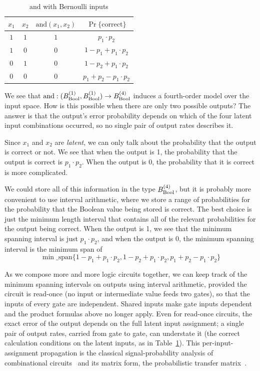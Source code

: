 \documentclass[../main.tex]{subfiles}
\begin{document}
\begin{table}[htbp]
\centering
\caption{$\mathrm{and}$ with Bernoulli inputs}
\label{tbl:and_bernoulli}
\begin{tabular}{@{}cccc@{}}
\toprule
$x_1$ & $x_2$ & $\mathrm{and}(x_1,x_2)$ & $\Pr\{\mathrm{correct}\}$ \\
\midrule
$1$ & $1$ & $1$ & $p_1 \cdot p_2$ \\
$1$ & $0$ & $0$ & $1 - p_1 + p_1 \cdot p_2$ \\
$0$ & $1$ & $0$ & $1 - p_2 + p_1 \cdot p_2$ \\
$0$ & $0$ & $0$ & $p_1 + p_2 - p_1 \cdot p_2$ \\
\bottomrule
\end{tabular}
\end{table}

We see that $\mathrm{and} : (B_{\mathrm{Bool}}^{(1)}, B_{\mathrm{Bool}}^{(1)}) \to B_{\mathrm{Bool}}^{(4)}$
induces a fourth-order model over the input space. How is this possible
when there are only two possible outputs? The answer is that the output's error
probability depends on which of the four latent input combinations occurred, so no
single pair of output rates describes it.

Since $x_1$ and $x_2$ are \emph{latent}, we can only talk about the probability that
the output is correct or not. We see that when the output is 1, the probability that
the output is correct is $p_1 \cdot p_2$. When the output is 0, the probability that it is
correct is more complicated.

We could store all of this information in the type $B_{\mathrm{Bool}}^{(4)}$, but it is
probably more convenient to use interval arithmetic, where we store a range of
probabilities for the probability that the Boolean value being stored is correct.
The best choice is just the minimum length interval that contains all of the
relevant probabilities for the output being correct. When the output is 1, we see
that the minimum spanning interval is just $p_1 \cdot p_2$, and when the output is 0,
the minimum spanning interval is the minimum span of
\begin{equation}
\min\_\mathrm{span}\{1 - p_1 + p_1 \cdot p_2, 1 - p_2 + p_1 \cdot p_2, p_1 + p_2 - p_1 \cdot p_2\}
\end{equation}

As we compose more and more logic circuits together, we can keep track of the
minimum spanning intervals on outputs using interval arithmetic, provided the circuit is
read-once (no input or intermediate value feeds two gates), so that the inputs of every
gate are independent. Shared inputs make gate inputs dependent and the product formulas
above no longer apply. Even for read-once circuits, the exact error of the output depends
on the full latent input assignment; a single pair of output rates, carried from gate to
gate, can understate it (the correct calculation conditions on the latent inputs, as in
Table~\ref{tbl:and_bernoulli}). This per-input-assignment propagation is the classical
signal-probability analysis of combinational circuits~\cite{parker1975probabilistic} and
its matrix form, the probabilistic transfer matrix~\cite{krishnaswamy2008ptm}.
\end{document}
